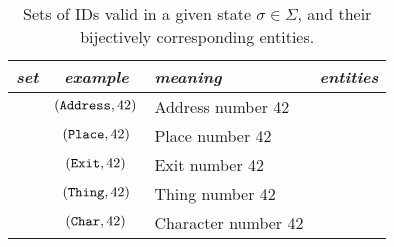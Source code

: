\bgroup
\def\arraystretch{1.5}
\begin{table}
  \centering
{\footnotesize
  \begin{tabular}{|l|c|l|l|}
    \hline
    {\em set} &
    {\em example} &
    {\em meaning} &
    {\em entities}
    \\ \hline \hline

      \addressidset{\sigma} &
      $ (\texttt{Address}, 42) $ &
      Address number 42 &
      \addressset{\sigma}
      \\ \hline

      \placeidset{\sigma} &
      $ (\texttt{Place}, 42) $ &
      Place number 42 &
      \placeset{\sigma}
      \\ \hline

      \exitidset{\sigma} &
      $ (\texttt{Exit}, 42) $ &
      Exit number 42 &
      \exitset{\sigma}
      \\ \hline

      \thingidset{\sigma} &
      $ (\texttt{Thing}, 42) $ &
      Thing number 42 &
      \thingset{\sigma}
      \\ \hline

      \charidset{\sigma} &
      $ (\texttt{Char}, 42) $ &
      Character number 42 &
      \charset{\sigma}
      \\ \hline

\end{tabular}
} %
  \caption{\label{tab:ids}Sets of IDs valid in a given state $\sigma
    \in \Sigma$, and their bijectively corresponding entities.}
\end{table}
\egroup
